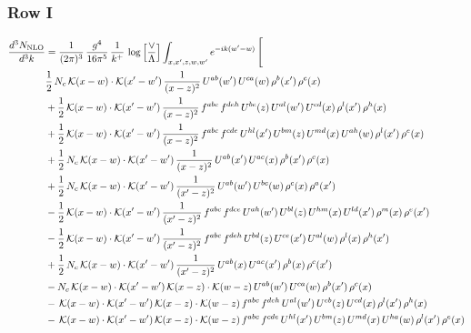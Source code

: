 \documentclass[9pt]{article}
\numberwithin{equation}{section}
\begin{document}
\subsubsection{Row I}
\begin{align}
\frac{d^{3}N_{\mathrm{NLO}}}{d^{3}k} & = \frac{1}{(2\pi)^{3}}\,\frac{g^{4}}{16\pi^{5}}\,\frac{1}{k^{+}}\,\log\Big[\frac{\vee}{\Lambda}\Big]\int_{x,x',z,w,w'}e^{-ik(w'-w)}\,\Bigg[\notag\\ & \frac{1}{2}\,N_{c}\,\mathcal{K}(x-w)\cdot\mathcal{K}(x'-w')\,\frac{1}{(x-z)^{2}}\,U^{ab}(w')\,U^{ca}(w)\,\rho^{b}(x')\,\rho^{c}(x)\notag\\
& +\frac{1}{2}\,\mathcal{K}(x-w)\cdot\mathcal{K}(x'-w')\,\frac{1}{(x-z)^{2}}\,f^{abc}\,f^{deh}\,U^{be}(z)\,U^{al}(w')\,U^{cd}(x)\,\rho^{l}(x')\,\rho^{h}(x)\notag\\
& +\frac{1}{2}\,\mathcal{K}(x-w)\cdot\mathcal{K}(x'-w')\,\frac{1}{(x-z)^{2}}\,f^{abc}\,f^{cde}\,U^{hl}(x')\,U^{bm}(z)\,U^{md}(x)\,U^{ah}(w)\,\rho^{l}(x')\,\rho^{e}(x)\notag\\
& +\frac{1}{2}\,N_{c}\,\mathcal{K}(x-w)\cdot\mathcal{K}(x'-w')\,\frac{1}{(x-z)^{2}}\,U^{ab}(x')\,U^{ac}(x)\,\rho^{b}(x')\,\rho^{c}(x)\notag\\
& +\frac{1}{2}\,N_{c}\,\mathcal{K}(x-w)\cdot\mathcal{K}(x'-w')\,\frac{1}{(x'-z)^{2}}\,U^{ab}(w')\,U^{bc}(w)\,\rho^{c}(x)\,\rho^{a}(x')\notag\\
& -\frac{1}{2}\,\mathcal{K}(x-w)\cdot\mathcal{K}(x'-w')\,\frac{1}{(x'-z)^{2}}\,f^{abc}\,f^{dce}\,U^{ah}(w')\,U^{bl}(z)\,U^{hm}(x)\,U^{ld}(x')\,\rho^{m}(x)\,\rho^{e}(x')\notag\\
& -\frac{1}{2}\,\mathcal{K}(x-w)\cdot\mathcal{K}(x'-w')\,\frac{1}{(x'-z)^{2}}\,f^{abc}\,f^{deh}\,U^{bd}(z)\,U^{ce}(x')\,U^{al}(w)\,\rho^{l}(x)\,\rho^{h}(x')\notag\\
& +\frac{1}{2}\,N_{c}\,\mathcal{K}(x-w)\cdot\mathcal{K}(x'-w')\,\frac{1}{(x'-z)^{2}}\,U^{ab}(x)\,U^{ac}(x')\,\rho^{b}(x)\,\rho^{c}(x')\notag\\
& -N_{c}\,\mathcal{K}(x-w)\cdot\mathcal{K}(x'-w')\,\mathcal{K}(x-z)\cdot\mathcal{K}(w-z)\,U^{ab}(w')\,U^{ca}(w)\,\rho^{b}(x')\,\rho^{c}(x)\notag\\
& -\,\mathcal{K}(x-w)\cdot\mathcal{K}(x'-w')\,\mathcal{K}(x-z)\cdot\mathcal{K}(w-z)\,f^{abc}\,f^{deh}\,U^{al}(w')\,U^{eb}(z)\,U^{cd}(x)\,\rho^{l}(x')\,\rho^{h}(x)\notag\\
& -\,\mathcal{K}(x-w)\cdot\mathcal{K}(x'-w')\,\mathcal{K}(x-z)\cdot\mathcal{K}(w-z)\,f^{abc}\,f^{cde}\,U^{hl}(x')\,U^{bm}(z)\,U^{md}(x)\,U^{ha}(w)\,\rho^{l}(x')\,\rho^{e}(x)\notag\\

\end{align}
\end{document}
